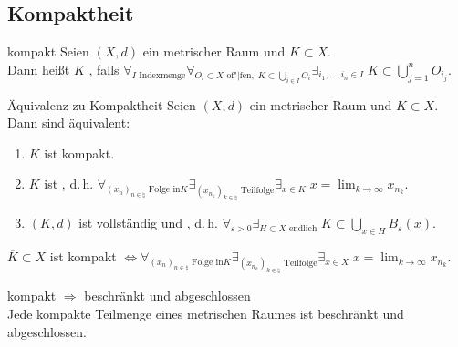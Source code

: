 \subsection{%
    Kompaktheit%
}

\begin{Def}{kompakt}
    Seien $(X, d)$ ein metrischer Raum und $K \subset X$.\\
    Dann heißt $K$ , falls
    $\forall_{I \text{ Indexmenge}} \forall_{O_i \subset X \text{ of"|fen},\;
    K \subset \bigcup_{i \in I} O_i} \exists_{i_1, \dotsc, i_n \in I}\;
    K \subset \bigcup_{j=1}^n O_{i_j}$.
\end{Def}


\begin{Satz}{Äquivalenz zu Kompaktheit}
    Seien $(X, d)$ ein metrischer Raum und $K \subset X$.\\
    Dann sind äquivalent:
    \begin{enumerate}
        \item
        $K$ ist kompakt.
        
        \item
        $K$ ist , d.\,h.
        $\forall_{(x_n)_{n \in \natural} \text{ Folge in} K}
        \exists_{(x_{n_k})_{k \in \natural} \text{ Teilfolge}} \exists_{x \in K}\;
        x = \lim_{k \to \infty} x_{n_k}$.
        
        \item
        $(K, d)$ ist vollständig und , d.\,h.
        $\forall_{\varepsilon > 0} \exists_{H \subset X \text{ endlich}}\;
        K \subset \bigcup_{x \in H} B_\varepsilon(x)$.
    \end{enumerate}
\end{Satz}

\begin{Bem}
    $\overline{K} \subset X$ ist kompakt $\iff
    \forall_{(x_n)_{n \in \natural} \text{ Folge in} K}
    \exists_{(x_{n_k})_{k \in \natural} \text{ Teilfolge}} \exists_{x \in X}\;
    x = \lim_{k \to \infty} x_{n_k}$.
\end{Bem}

\linie
\pagebreak

\begin{Satz}{kompakt $\Rightarrow$ beschränkt und abgeschlossen}\\
    Jede kompakte Teilmenge eines metrischen Raumes ist beschränkt und abgeschlossen.
\end{Satz}

